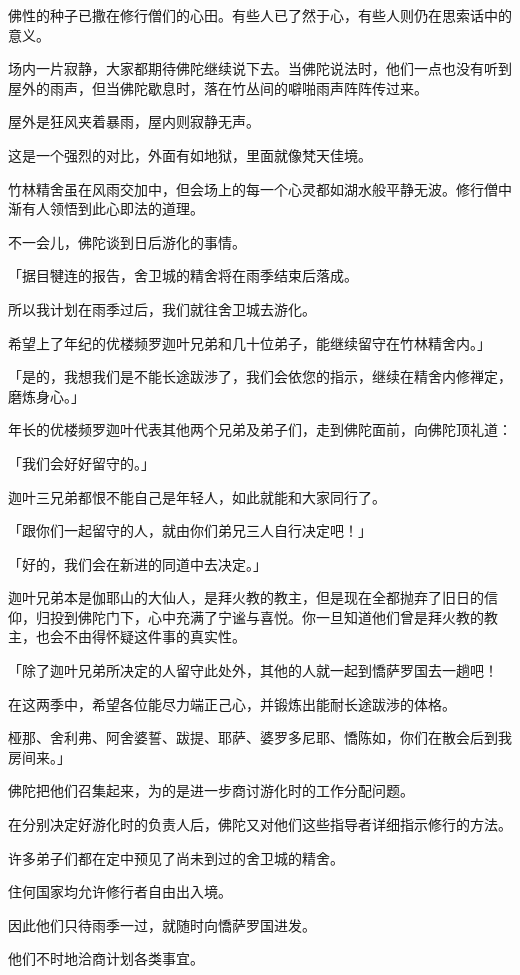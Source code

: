 \documentclass[twoside,openany]{book}
\begin{document}
佛性的种子已撒在修行僧们的心田。有些人已了然于心，有些人则仍在思索话中的意义。

场内一片寂静，大家都期待佛陀继续说下去。当佛陀说法时，他们一点也没有听到屋外的雨声，但当佛陀歇息时，落在竹丛间的噼啪雨声阵阵传过来。

屋外是狂风夹着暴雨，屋内则寂静无声。

这是一个强烈的对比，外面有如地狱，里面就像梵天佳境。

竹林精舍虽在风雨交加中，但会场上的每一个心灵都如湖水般平静无波。修行僧中渐有人领悟到此心即法的道理。

不一会儿，佛陀谈到日后游化的事情。

「据目犍连的报告，舍卫城的精舍将在雨季结束后落成。

所以我计划在雨季过后，我们就往舍卫城去游化。

希望上了年纪的优楼频罗迦叶兄弟和几十位弟子，能继续留守在竹林精舍内。」

「是的，我想我们是不能长途跋渉了，我们会依您的指示，继续在精舍内修禅定，磨炼身心。」

年长的优楼频罗迦叶代表其他两个兄弟及弟子们，走到佛陀面前，向佛陀顶礼道：

「我们会好好留守的。」

迦叶三兄弟都恨不能自己是年轻人，如此就能和大家同行了。

「跟你们一起留守的人，就由你们弟兄三人自行决定吧！」

「好的，我们会在新进的同道中去决定。」

迦叶兄弟本是伽耶山的大仙人，是拜火教的教主，但是现在全都抛弃了旧日的信仰，归投到佛陀门下，心中充满了宁谧与喜悦。你一旦知道他们曾是拜火教的教主，也会不由得怀疑这件事的真实性。

「除了迦叶兄弟所决定的人留守此处外，其他的人就一起到憍萨罗国去一趟吧！

在这两季中，希望各位能尽力端正己心，并锻炼出能耐长途跋渉的体格。

桠那、舍利弗、阿舍婆誓、跋提、耶萨、婆罗多尼耶、憍陈如，你们在散会后到我房间来。」

佛陀把他们召集起来，为的是进一步商讨游化时的工作分配问题。

在分别决定好游化时的负责人后，佛陀又对他们这些指导者详细指示修行的方法。

许多弟子们都在定中预见了尚未到过的舍卫城的精舍。

住何国家均允许修行者自由出入境。

因此他们只待雨季一过，就随时向憍萨罗国进发。

他们不时地洽商计划各类事宜。
\end{document}
